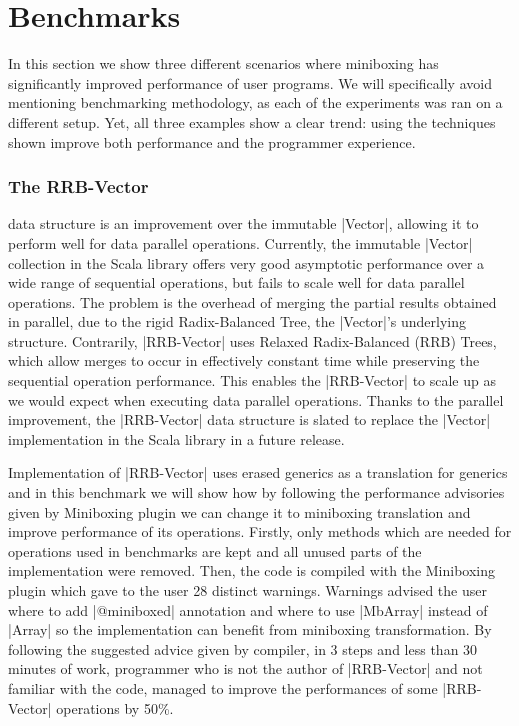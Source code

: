 \vspace{-0.3em}

\section{Benchmarks}
\label{sec:bench}

\vspace{-0.3em}

In this section we show three different scenarios where miniboxing has significantly improved performance of user programs. We will specifically avoid mentioning benchmarking methodology, as each of the experiments was ran on a different setup. Yet, all three examples show a clear trend: using the techniques shown improve both performance and the programmer experience.

\vspace{-0.3em}

\subsubsection{The RRB-Vector} data structure \cite{rrb-vector-paper} \cite{nicolas-thesis} is an improvement over the immutable |Vector|, allowing it to perform well for data parallel operations. Currently, the immutable |Vector| collection in the Scala library offers very good asymptotic performance over a wide range of sequential operations, but fails to scale well for data parallel operations. The problem is the overhead of merging the partial results obtained in parallel, due to the rigid Radix-Balanced Tree, the |Vector|'s underlying structure. Contrarily, |RRB-Vector| uses Relaxed Radix-Balanced (RRB) Trees, which allow merges to occur in effectively constant time while preserving the sequential operation performance. This enables the |RRB-Vector| to scale up as we would expect when executing data parallel operations. Thanks to the parallel improvement, the |RRB-Vector| data structure is slated to replace the |Vector| implementation in the Scala library in a future release.

Implementation of |RRB-Vector| uses erased generics as a translation for generics and in this benchmark we will show how by following the performance advisories given by Miniboxing plugin we can change it to miniboxing translation and improve performance of its operations. Firstly, only methods which are needed for operations used in benchmarks are kept \cite{rrb-vector-miniboxed-impl} and all unused parts of the implementation were removed. Then, the code is compiled with the Miniboxing plugin which gave to the user 28 distinct warnings. Warnings advised the user where to add |@miniboxed| annotation and where to use |MbArray| instead of |Array| so the implementation can benefit from miniboxing transformation. By following the suggested advice given by compiler, in 3 steps and less than 30 minutes of work, programmer who is not the author of |RRB-Vector| and not familiar with the code, managed to improve the performances of some |RRB-Vector| operations by 50\%.

